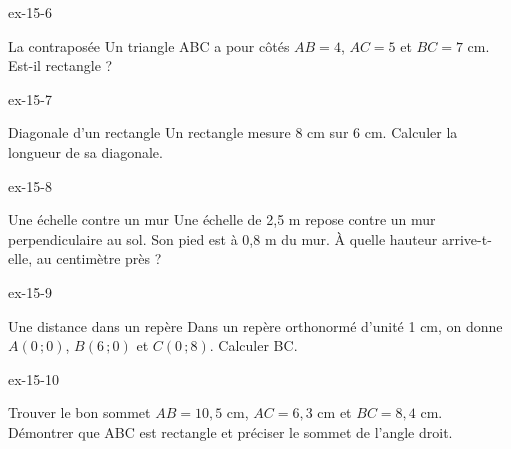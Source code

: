 \begin{blocLivre}{ex-15-6}\begin{exercice}[2]{La contraposée}
Un triangle ABC a pour côtés $AB=4$, $AC=5$ et $BC=7$ cm. Est-il rectangle ?
\label{fig-ex-15-6}
\end{exercice}\end{blocLivre}
\begin{blocLivre}{ex-15-7}\begin{exercice}[2]{Diagonale d’un rectangle}
Un rectangle mesure 8 cm sur 6 cm. Calculer la longueur de sa diagonale.
\label{fig-ex-15-7}
\end{exercice}\end{blocLivre}
\begin{blocLivre}{ex-15-8}\begin{exercice}[2]{Une échelle contre un mur}
Une échelle de 2,5 m repose contre un mur perpendiculaire au sol. Son pied est à 0,8 m du mur. À quelle hauteur arrive-t-elle, au centimètre près ?
\label{fig-ex-15-8}
\end{exercice}\end{blocLivre}
\begin{blocLivre}{ex-15-9}\begin{exercice}[2]{Une distance dans un repère}
Dans un repère orthonormé d’unité 1 cm, on donne $A(0\,;0)$, $B(6\,;0)$ et $C(0\,;8)$. Calculer BC.
\label{fig-ex-15-9}
\end{exercice}\end{blocLivre}
\begin{blocLivre}{ex-15-10}\begin{exercice}[2]{Trouver le bon sommet}
$AB=10{,}5$ cm, $AC=6{,}3$ cm et $BC=8{,}4$ cm. Démontrer que ABC est rectangle et préciser le sommet de l’angle droit.
\label{fig-ex-15-10}
\end{exercice}\end{blocLivre}

